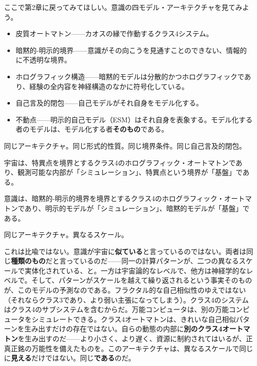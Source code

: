 \documentclass[11pt, twoside, openright]{book}
\begin{document}
ここで第2章に戻ってみてほしい。意識の四モデル・アーキテクチャを見てみよう。

\begin{itemize}
  \item 皮質オートマトン------カオスの縁で作動するクラス4システム。
  \item 暗黙的-明示的境界------意識がその向こうを見通すことのできない、情報的に不透明な境界。
  \item ホログラフィック構造------暗黙的モデルは分散的かつホログラフィックであり、経験の全内容を神経構造のなかに符号化している。
  \item 自己言及的閉包------自己モデルがそれ自身をモデル化する。
  \item 不動点------明示的自己モデル（ESM）はそれ自身を表象する。モデル化する者のモデルは、モデル化する者\textbf{そのもの}である。
\end{itemize}

同じアーキテクチャ。同じ形式的性質。同じ境界条件。同じ自己言及的閉包。

宇宙は、特異点を境界とするクラス4のホログラフィック・オートマトンであり、観測可能な内部が「シミュレーション」、特異点という境界が「基盤」である。

意識は、暗黙的-明示的境界を境界とするクラス4のホログラフィック・オートマトンであり、明示的モデルが「シミュレーション」、暗黙的モデルが「基盤」である。

同じアーキテクチャ。異なるスケール。

これは比喩ではない。意識が宇宙に\textbf{似ている}と言っているのではない。両者は同じ\textbf{種類のもの}だと言っているのだ------同一の計算パターンが、二つの異なるスケールで実体化されている、と。一方は宇宙論的なレベルで、他方は神経学的なレベルで。そして、パターンがスケールを越えて繰り返されるという事実そのものが、このモデルの予測なのである。フラクタル的な自己相似性のゆえではない（それならクラス3であり、より弱い主張になってしまう）。クラス4のシステムはクラス4のサブシステムを含むからだ。万能コンピュータは、別の万能コンピュータをシミュレートできる。クラス4オートマトンは、きれいな自己相似パターンを生み出すだけの存在ではない。自らの動態の内部に\textbf{別のクラス4オートマトン}を生み出すのだ------より小さく、より遅く、資源に制約されてはいるが、正真正銘の万能性を備えたものを。このアーキテクチャは、異なるスケールで同じに\textbf{見える}だけではない。同じ\textbf{である}のだ。
\end{document}
